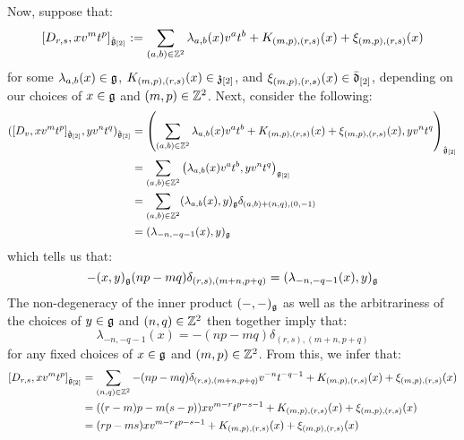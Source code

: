 \begin{remark}
\begin{itemize}
                    Now, suppose that:
                        $$[D_{r, s}, x v^m t^p]_{\hat{\mathfrak{g}}_{[2]}} := \sum_{(a, b) \in \mathbb{Z}^2} \lambda_{a, b}(x) v^a t^b + K_{(m, p), (r, s)}(x) + \xi_{(m, p), (r, s)}(x)$$
                    for some $\lambda_{a, b}(x) \in \mathfrak{g}$, $K_{(m, p), (r, s)}(x) \in \mathfrak{z}_{[2]}$, and $\xi_{(m, p), (r, s)}(x) \in \bar{\mathfrak{d}}_{[2]}$, depending on our choices of $x \in \mathfrak{g}$ and $(m, p) \in \mathbb{Z}^2$. Next, consider the following:
                        $$
                            \begin{aligned}
                                ( [D_v, x v^m t^p]_{\hat{\mathfrak{g}}_{[2]}}, y v^n t^q )_{\hat{\mathfrak{g}}_{[2]}} & = \left( \sum_{(a, b) \in \mathbb{Z}^2} \lambda_{a, b}(x) v^a t^b + K_{(m, p), (r, s)}(x) + \xi_{(m, p), (r, s)}(x), y v^n t^q \right)_{\hat{\mathfrak{g}}_{[2]}}
                                \\
                                & = \sum_{(a, b) \in \mathbb{Z}^2} \left( \lambda_{a, b}(x) v^a t^b, y v^n t^q \right)_{\mathfrak{g}_{[2]}}
                                \\
                                & = \sum_{(a, b) \in \mathbb{Z}^2} (\lambda_{a, b}(x), y)_{\mathfrak{g}} \delta_{ (a, b) + (n, q), (0, -1) }
                                \\
                                & = (\lambda_{-n, -q - 1}(x), y)_{\mathfrak{g}}
                            \end{aligned}
                        $$
                    which tells us that:
                        $$-(x, y)_{\mathfrak{g}} (np - mq) \delta_{(r, s), (m + n, p + q)} = (\lambda_{-n, -q - 1}(x), y)_{\mathfrak{g}}$$
                    The non-degeneracy of the inner product $(-, -)_{\mathfrak{g}}$ as well as the arbitrariness of the choices of $y \in \mathfrak{g}$ and $(n, q) \in \mathbb{Z}^2$ then together imply that:
                        $$\lambda_{-n, -q - 1}(x) = -(np - mq) \delta_{(r, s), (m + n, p + q)}$$
                    for any fixed choices of $x \in \mathfrak{g}$ and $(m, p) \in \mathbb{Z}^2$. From this, we infer that:
                        $$
                            \begin{aligned}
                                [D_{r, s}, x v^m t^p]_{\hat{\g}_{[2]}} & = \sum_{(n, q) \in \Z^2} -(np - mq) \delta_{(r, s), (m + n, p + q)} v^{-n} t^{-q - 1} + K_{(m, p), (r, s)}(x) + \xi_{(m, p), (r, s)}(x)
                                \\
                                & = ( (r - m)p - m(s - p) ) x v^{m - r} t^{p - s - 1} + K_{(m, p), (r, s)}(x) + \xi_{(m, p), (r, s)}(x)
                                \\
                                & = ( rp - ms ) x v^{m - r} t^{p - s - 1} + K_{(m, p), (r, s)}(x) + \xi_{(m, p), (r, s)}(x)
                            \end{aligned}
                        $$
                        

\end{itemize}
\end{remark}
